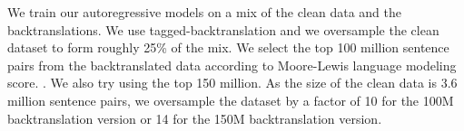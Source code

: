 We train our autoregressive models on a mix of the clean data and the
backtranslations. We use tagged-backtranslation and we oversample the clean
dataset to form roughly 25\% of the mix. We select the top 100 million sentence
pairs from the backtranslated data according to Moore-Lewis language modeling
score. . We also try using
the top 150 million.  As the size of the clean data is 3.6
million sentence pairs, we oversample the dataset by a factor of 10 for the 100M
backtranslation version or 14 for the 150M backtranslation version.



%

%

